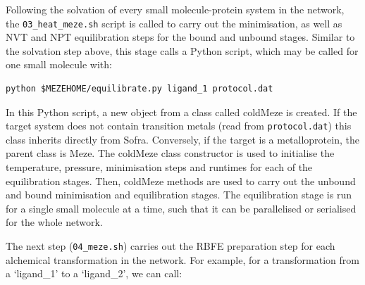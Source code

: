 Following the solvation of every small molecule-protein system in the network, the \texttt{03\_heat\_meze.sh} script is called to carry out the minimisation, as well as NVT and NPT equilibration steps for the bound and unbound stages. Similar to the solvation step above, this stage calls a Python script, which may be called for one small molecule with:

\begin{tcolorbox}[title=Minimisation and equilibration:,breakable, colframe=myframecolour]
\begin{verbatim}
python $MEZEHOME/equilibrate.py ligand_1 protocol.dat 
\end{verbatim}
\end{tcolorbox}

\noindent In this Python script, a new object from a class called coldMeze is created. If the target system does not contain transition metals (read from \texttt{protocol.dat}) this class inherits directly from Sofra. Conversely, if the target is a metalloprotein, the parent class is Meze. The coldMeze class constructor is used to initialise the temperature, pressure, minimisation steps and runtimes for each of the equilibration stages. Then, coldMeze methods are used to carry out the unbound and bound minimisation and equilibration stages. The equilibration stage is run for a single small molecule at a time, such that it can be parallelised or serialised for the whole network.

The next step (\texttt{04\_meze.sh}) carries out the RBFE preparation step for each alchemical transformation in the network. For example, for a transformation from a `ligand\_1' to a `ligand\_2', we can call: 

